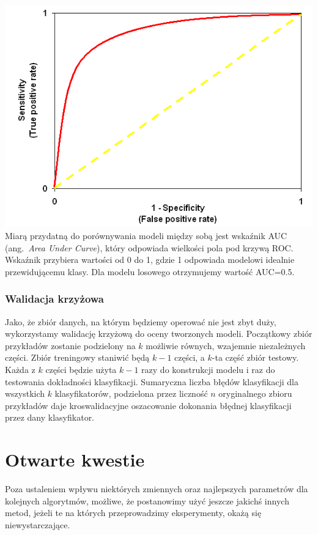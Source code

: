 \documentclass{article}
\newcommand{\ang}[1]{ang.~{\itshape #1}}
\begin{document}
\includegraphics[scale=0.55]{../pictures/decoy4}\\

Miarą przydatną do porównywania modeli między sobą jest wskaźnik AUC (\ang{Area Under Curve}), który odpowiada wielkości pola pod krzywą ROC. Wskaźnik przybiera wartości od 0 do 1, gdzie 1 odpowiada modelowi idealnie przewidującemu klasy. Dla modelu losowego otrzymujemy wartość AUC=0.5.

\subsubsection{Walidacja krzyżowa}
Jako, że zbiór danych, na którym będziemy operować nie jest zbyt duży, wykorzystamy walidację krzyżową do oceny tworzonych modeli. Początkowy zbiór przykładów zostanie podzielony na $k$ możliwie równych, wzajemnie niezależnych części. Zbiór treningowy staniwić będą $k-1$ części, a $k$-ta część zbiór testowy. Każda z $k$ części będzie użyta $k-1$ razy do konstrukcji modelu i raz do testowania dokładności klasyfikacji. Sumaryczna liczba błędów klasyfikacji dla wszystkich $k$ klasyfikatorów, podzielona przez liczność $n$ oryginalnego zbioru przykładów daje kroswalidacyjne oszacowanie dokonania błędnej klasyfikacji przez dany klasyfikator.

\section{Otwarte kwestie}
Poza ustaleniem wpływu niektórych zmiennych oraz najlepszych parametrów dla kolejnych algorytmów, możliwe, że postanowimy użyć jeszcze jakichś innych metod, jeżeli te na których przeprowadzimy eksperymenty, okażą się niewystarczające.
\end{document}
